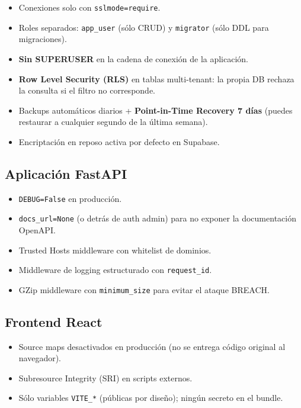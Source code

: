 \documentclass[12pt,a4paper,oneside]{article}
\begin{document}
\begin{itemize}[leftmargin=*]
  \item Conexiones solo con \texttt{sslmode=require}.
  \item Roles separados: \texttt{app\_user} (sólo CRUD) y \texttt{migrator} (sólo DDL para migraciones).
  \item \textbf{Sin SUPERUSER} en la cadena de conexión de la aplicación.
  \item \textbf{Row Level Security (RLS)} en tablas multi-tenant: la propia DB rechaza la consulta si el filtro no corresponde.
  \item Backups automáticos diarios + \textbf{Point-in-Time Recovery 7 días} (puedes restaurar a cualquier segundo de la última semana).
  \item Encriptación en reposo activa por defecto en Supabase.
\end{itemize}

\subsection{Aplicación FastAPI}

\begin{itemize}[leftmargin=*]
  \item \texttt{DEBUG=False} en producción.
  \item \texttt{docs\_url=None} (o detrás de auth admin) para no exponer la documentación OpenAPI.
  \item Trusted Hosts middleware con whitelist de dominios.
  \item Middleware de logging estructurado con \texttt{request\_id}.
  \item GZip middleware con \texttt{minimum\_size} para evitar el ataque BREACH.
\end{itemize}

\subsection{Frontend React}

\begin{itemize}[leftmargin=*]
  \item Source maps desactivados en producción (no se entrega código original al navegador).
  \item Subresource Integrity (SRI) en scripts externos.
  \item Sólo variables \texttt{VITE\_*} (públicas por diseño); ningún secreto en el bundle.
\end{itemize}
\end{document}
